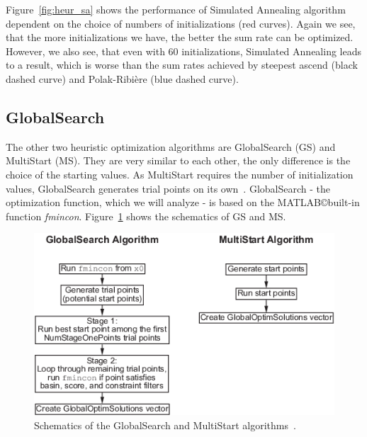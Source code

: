 Figure~\ref{fig:heur_sa} shows the performance of Simulated Annealing algorithm dependent on the choice of numbers of initializations (red curves).
Again we see, that the more initializations we have, the better the sum rate can be optimized.
However, we also see, that even with 60 initializations, Simulated Annealing leads to a result, which is worse than the sum rates achieved by steepest ascend (black dashed curve) and Polak-Ribi\`{e}re (blue dashed curve).


\subsection{GlobalSearch}
\label{sec:globals}
The other two heuristic optimization algorithms are GlobalSearch (GS) and MultiStart (MS).
They are very similar to each other, the only difference is the choice of the starting values.
As MultiStart requires the number of initialization values, GlobalSearch generates trial points on its own~\cite{matlab:gloabls}.
GlobalSearch - the optimization function, which we will analyze - is based on the MATLAB\copyright  built-in function \textit{fmincon}.
Figure~\ref{fig:globals_scheme} shows the schematics of GS and MS.
\begin{figure}[h]
\centering
  \includegraphics[width=0.5\linewidth]{images/global_algorithm.png}
\caption{Schematics of the GlobalSearch and MultiStart algorithms~\cite{matlab:gloabls}.}
\label{fig:globals_scheme}
\end{figure}

